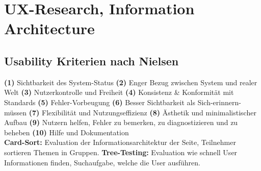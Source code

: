 
\section{UX-Research, Information Architecture}
\subsection{Usability Kriterien nach Nielsen}
\textbf{(1)} Sichtbarkeit des System-Status \textbf{(2)} Enger Bezug zwischen System und realer Welt \textbf{(3)} Nutzerkontrolle und Freiheit \textbf{(4)} Konsistenz \& Konformität mit Standards \textbf{(5)} Fehler-Vorbeugung \textbf{(6)} Besser Sichtbarkeit als Sich-erinnern-müssen \textbf{(7)} Flexibilität und Nutzungseffizienz \textbf{(8)} Ästhetik und minimalistischer Aufbau \textbf{(9)} Nutzern helfen, Fehler zu bemerken, zu diagnostizieren und zu beheben \textbf{(10)} Hilfe und Dokumentation\\
\textbf{\color{blue}Card-Sort:} Evaluation der Informationsarchitektur der Seite, Teilnehmer sortieren Themen in Gruppen.
\textbf{\color{blue}Tree-Testing:}  Evaluation wie schnell User Informationen finden, Suchaufgabe, welche die User ausführen.











